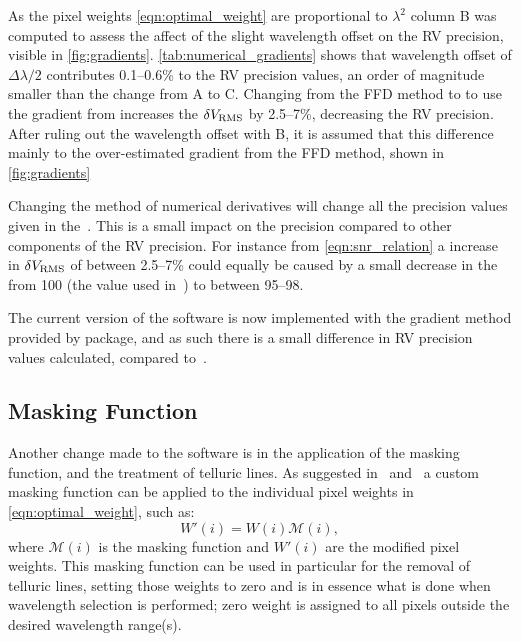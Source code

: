 As the pixel weights \cref{eqn:optimal_weight} are proportional to \({\lambda}^{2}\) column B was computed to assess the affect of the slight wavelength offset on the {RV} precision, visible in \cref{fig:gradients}.
\cref{tab:numerical_gradients} shows that wavelength offset of \(\Delta\lambda/2\) contributes 0.1--0.6\% to the {RV} precision values, an order of magnitude smaller than the change from A to C.
Changing from the {FFD} method to \npgradient{} to use the gradient from \numpy{} increases the \(\delta V_{\textrm{RMS}}\) by 2.5--7\%, decreasing the {RV} precision.
After ruling out the wavelength offset with B, it is assumed that this difference mainly to the over-estimated gradient from the {FFD} method, shown in \cref{fig:gradients}

Changing the method of numerical derivatives will change all the precision values given in the~\citet{figueira_radial_2016}.
This is a small impact on the precision compared to other components of the {RV} precision.
For instance from \cref{eqn:snr_relation} a increase in \(\delta V_{\textrm{RMS}}\) of between 2.5--7\% could equally be caused by a small decrease in the \snr{} from 100 (the value used in~\citet{figueira_radial_2016}) to between 95--98.

The current version of the software is now implemented with the gradient method provided by \numpy{} package, and as such there is a small difference in {RV} precision values calculated, compared to~\citep{figueira_radial_2016}.

\subsection{Masking Function}
\label{subsec:masking_function}
Another change made to the software is in the application of the masking function, and the treatment of telluric lines.
As suggested in~\citet{connes_absolute_1985} and~\citet{bouchy_fundamental_2001} a custom masking function can be applied to the individual pixel weights in \cref{eqn:optimal_weight}, such as:
\begin{equation}
W'(i) = W(i)\mathcal{M}(i),\label{eqn:mask_function}
\end{equation}
where \(\mathcal{M}(i)\) is the masking function and \(W'(i)\) are the modified pixel weights.
This masking function can be used in particular for the removal of telluric lines, setting those weights to zero and is in essence what is done when wavelength selection is performed; zero weight is assigned to all pixels outside the desired wavelength range(s).

